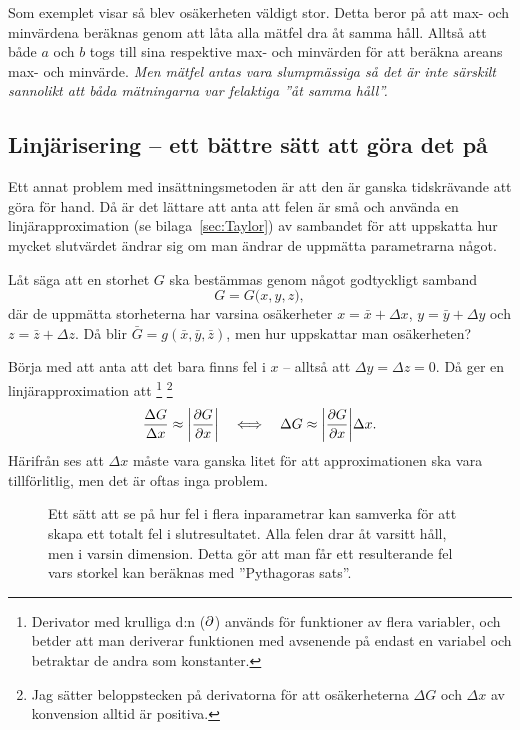 \documentclass[11pt,a4paper, swedish
]{article}
\begin{document}
Som exemplet visar så blev osäkerheten väldigt stor. Detta beror på
att max- och minvärdena beräknas genom att låta alla mätfel dra åt
samma håll. Alltså att både $a$ och $b$ togs till sina respektive max-
och minvärden för att beräkna areans max- och minvärde. 
\emph{Men mätfel antas vara slumpmässiga så det är inte särskilt sannolikt
att båda mätningarna var felaktiga ''åt samma håll''. }

\subsection{Linjärisering -- ett bättre sätt att göra det på}
Ett annat problem med insättningsmetoden är att den är ganska tidskrävande
att göra för hand. Då är det lättare att anta att felen är små och
använda en linjärapproximation (se bilaga~\ref{sec:Taylor}) av
sambandet för att uppskatta hur mycket slutvärdet ändrar sig om man
ändrar de uppmätta parametrarna något.

Låt säga att en storhet $G$ ska bestämmas genom något godtyckligt
samband 
\begin{equation}\label{eq:some_function}
G=G\big(x, y, z \big),
\end{equation}
där de uppmätta storheterna har varsina osäkerheter
$x=\bar{x}+\Delta{x}$, $y=\bar{y}+\Delta{y}$ och
$z=\bar{z}+\Delta{z}$. Då blir $\bar{G}=g(\bar{x}, \bar{y}, \bar{z})$,
men hur uppskattar man osäkerheten?

Börja med att anta att det bara finns fel i $x$ -- alltså att
$\Delta{y}=\Delta{z}=0$. Då ger en linjärapproximation att
\footnote{Derivator med krulliga d:n ($\partial$) används för funktioner av
  flera variabler, och betder att man deriverar funktionen med
  avsenende på endast en variabel och betraktar de andra som
  konstanter.}
\footnote{Jag sätter beloppstecken på derivatorna för att
  osäkerheterna $\Delta{G}$ och $\Delta{x}$ av konvension alltid är
  positiva.} 
\begin{equation}\label{eq:error_one_variable}
\frac{\Delta{G}}{\Delta{x}} \approx \abs{ \pdv{G}{x} } 
\quad\Longleftrightarrow\quad
\Delta{G} \approx \abs{ \pdv{G}{x} } \Delta{x}.
\end{equation}
Härifrån ses att $\Delta{x}$ måste vara ganska litet för att
approximationen ska vara tillförlitlig, men det är oftas inga problem. 


\begin{figure}
\centering

\caption{Ett sätt att se på hur fel i flera inparametrar kan samverka
  för att skapa ett totalt fel i slutresultatet. Alla felen drar åt
  varsitt håll, men i varsin dimension. Detta gör att man får ett
  resulterande fel vars storkel kan beräknas med ''Pythagoras sats''.}
\label{fig:3D}
\end{figure}
\end{document}
